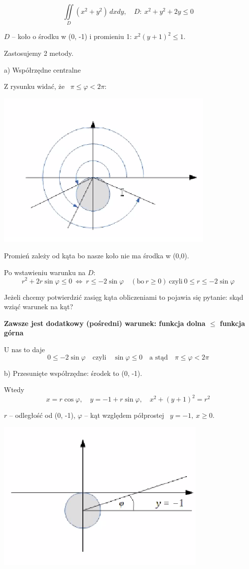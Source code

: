 \begin{przykladbig}
    \[ \iint\limits_D (x^2 + y^2) \, dxdy, \quad D: \ x^2 + y^2 + 2y \leq 0 \]

    $D$ -- koło o środku w (0, -1) i promieniu 1: $ x^2 (y+1)^2 \leq 1 $.

    Zastosujemy 2 metody. \bigskip

    a) Współrzędne centralne

    Z rysunku widać, że \ $ \pi \leq \varphi < 2\pi $:

    \includegraphics[scale=0.5]{img/kolkakat.png}

    Promień zależy od kąta bo nasze koło nie ma środka w (0,0).

    Po wstawieniu warunku na $D$:
    \[ r^2 + 2r \sin \varphi \leq 0 \ \Leftrightarrow \ r \leq -2 \sin \varphi \quad (\textrm{bo} \ r \geq 0) \ \textrm{czyli} \ 0 \leq r \leq -2 \sin \varphi \]

    Jeżeli chcemy potwierdzić zasięg kąta obliczeniami to pojawia się pytanie: skąd wziąć warunek na kąt? \bigskip

    \textbf{Zawsze jest dodatkowy (pośredni) warunek: funkcja dolna $ \leq $ funkcja górna}

    U nas to daje
    \[ 0 \leq -2 \sin \varphi \quad \textrm{czyli} \quad \sin \varphi \leq 0 \quad \textrm{a stąd} \quad \pi \leq \varphi < 2 \pi \] \bigskip

    b) Przesunięte współrzędne: środek to (0, -1).

    Wtedy
    \[ x = r \cos \varphi, \quad y = -1 + r \sin \varphi, \quad x^2 + (y+1)^2 = r^2 \]

    $r$ -- odległość od (0, -1),
    $\varphi $ -- kąt względem półprostej \ $ y = -1, \ x \geq 0 $.

    \includegraphics[scale=0.6]{img/okragikat.png}


\end{przykladbig}
